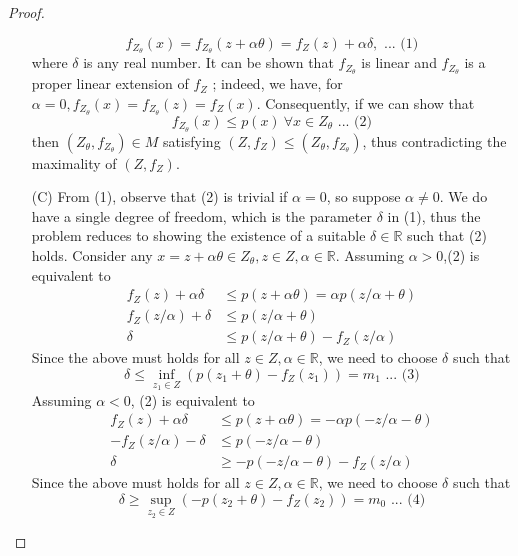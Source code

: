 \documentclass[11pt,a4paper]{article}
\begin{document}
\begin{proof}
\begin{enumerate}
            $$
                f_{Z_{\theta}}(x) = f_{Z_{\theta}} (z + \alpha \theta) = f_Z (z) + \alpha \delta, \text{ ... (1)}
            $$
            where $\delta$ is any real number. It can be shown that $f_{Z_\theta}$ is linear and $f_{Z_{\theta}}$ is a proper linear extension of $f_Z$ ; indeed, we have, for $\alpha = 0, f_{Z_{\theta}} (x) = f_{Z_{\theta}} (z) = f_Z (x)$. Consequently, if we can show that
            $$
                f_{Z_{\theta}}(x) \leq p(x)\ \forall x \in Z_{\theta}  \text{ ... (2)}
            $$
            then $(Z_{\theta} , f_{Z_{\theta}})  \in  M$ satisfying $(Z, f_Z) \leq (Z_{\theta} , f_{Z_{\theta}} )$, thus contradicting the maximality of $(Z,f_Z)$.
            
            \item[(C)] From (1), observe that (2) is trivial if $\alpha = 0$, so suppose $\alpha \neq 0$. We do have a single degree of freedom, which is the parameter $\delta$ in (1), thus the problem reduces to showing the existence of a suitable $\delta \in \mathbb{R}$ such that (2) holds. Consider any $x = z + \alpha \theta \in Z_{\theta} , z \in Z, \alpha \in \mathbb{R}$. Assuming $ \alpha > 0$,(2) is equivalent to
            \begin{align*}
                f_Z(z) + \alpha \delta &\leq p(z + \alpha \theta) = \alpha p(z/\alpha + \theta) \\
                f_Z (z/\alpha) + \delta &\leq p(z/\alpha + \theta)\\
                \delta &\leq p(z/\alpha + \theta) - f_Z(z/\alpha)
            \end{align*}
            Since the above must holds for all $z \in Z, \alpha \in \mathbb{R}$, we need to choose $\delta$ such that
            $$
                \delta \leq \inf_{z_1 \in Z} (p(z_1 + \theta) - f_Z(z_1)) = m_1 \text{ ... (3)}
            $$
            Assuming $ \alpha < 0$, (2) is equivalent to
            \begin{align*}
                f_Z(z) + \alpha \delta &\leq p(z + \alpha \theta) = -\alpha p(-z/\alpha - \theta)\\
                - f_Z(z/\alpha) - \delta &\leq p(-z/\alpha - \theta)\\
                \delta &\geq -p(-z/\alpha - \theta) - f_Z(z/\alpha)
            \end{align*}
            Since the above must holds for all $z \in Z, \alpha \in \mathbb{R}$, we need to choose $\delta$ such that
            $$
                \delta \geq \sup_{z_2 \in Z} (- p(z_2 + \theta) - f_Z(z_2)) = m_0 \text{ ... (4)}
$$
\end{enumerate}
\end{proof}
\end{document}
